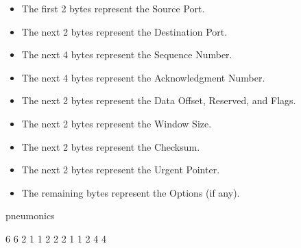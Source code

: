 \documentclass{article}
\begin{document}
\begin{flushleft}
    \begin{itemize}
        \item The first 2 bytes represent the Source Port.
        \item The next 2 bytes represent the Destination Port.
        \item The next 4 bytes represent the Sequence Number.
        \item The next 4 bytes represent the Acknowledgment Number.
        \item The next 2 bytes represent the Data Offset, Reserved, and Flags.
        \item The next 2 bytes represent the Window Size.
        \item The next 2 bytes represent the Checksum.
        \item The next 2 bytes represent the Urgent Pointer.
        \item The remaining bytes represent the Options (if any).
    \end{itemize}

    pneumonics

    6 6 2 1 1 2 2 2 1 1 2 4 4


        

\end{flushleft}
\end{document}
